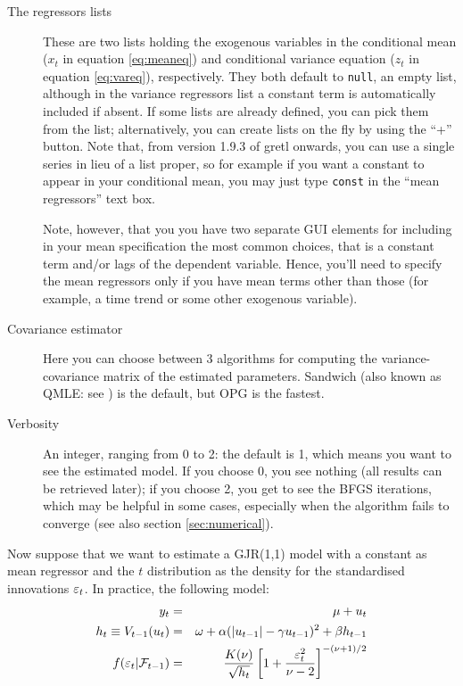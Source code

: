 \documentclass[a4paper,11pt]{article}
\newcommand{\app}[1]{\textsf{#1}}
\newcounter{script}[section]
\newcommand{\stdu}{\ensuremath \varepsilon}
\newcommand{\uhat}{\ensuremath u}
\newcommand{\InfSet}[1]{\ensuremath \mathcal{F}_{#1}}
\begin{document}
\begin{description}
\item[The regressors lists] These are two lists holding the exogenous
  variables in the conditional mean ($x_t$ in equation
  \ref{eq:meaneq}) and conditional variance equation ($z_t$ in
  equation \ref{eq:vareq}), respectively. They both default to
  \texttt{null}, an empty list, although in the variance regressors
  list a constant term is automatically included if absent. If some
  lists are already defined, you can pick them from the list;
  alternatively, you can create lists on the fly by using the ``+''
  button.  Note that, from version 1.9.3 of \app{gretl} onwards, you
  can use a single series in lieu of a list proper, so for example if
  you want a constant to appear in your conditional mean, you may just
  type \texttt{const} in the ``mean regressors'' text box.

  Note, however, that you you have two separate GUI elements for
  including in your mean specification the most common choices, that
  is a constant term and/or lags of the dependent variable. Hence,
  you'll need to specify the mean regressors only if you have mean
  terms other than those (for example, a time trend or some other
  exogenous variable).

\item[Covariance estimator] Here you can choose between 3 algorithms
  for computing the variance-covariance matrix of the estimated
  parameters. Sandwich (also known as QMLE: see \cite{bolwoo92}) is
  the default, but OPG is the fastest.
\item[Verbosity] An integer, ranging from 0 to 2: the default is 1,
  which means you want to see the estimated model. If you choose 0,
  you see nothing (all results can be retrieved later); if you choose
  2, you get to see the BFGS iterations, which may be helpful in some
  cases, especially when the algorithm fails to converge (see also
  section \ref{sec:numerical}).
\end{description}

Now suppose that we want to estimate a GJR(1,1) model with a constant
as mean regressor and the $t$ distribution as the density for the
standardised innovations $\stdu_t$. In practice, the following model:
\begin{eqnarray*}
  y_t & = & \mu + \uhat_{t} \\
  h_t \equiv V_{t-1}(\uhat_{t}) & = & \omega +
  \alpha(|\uhat_{t-1}| - \gamma \uhat_{t-1})^2 + \beta h_{t-1} \\
  f(\stdu_t | \InfSet{t-1}) & = & \frac{K(\nu)}{\sqrt{h_t}}
    \left[1+\frac{\stdu_t^2}{\nu-2}\right]^{-(\nu + 1)/2}
\end{eqnarray*}
\end{document}
